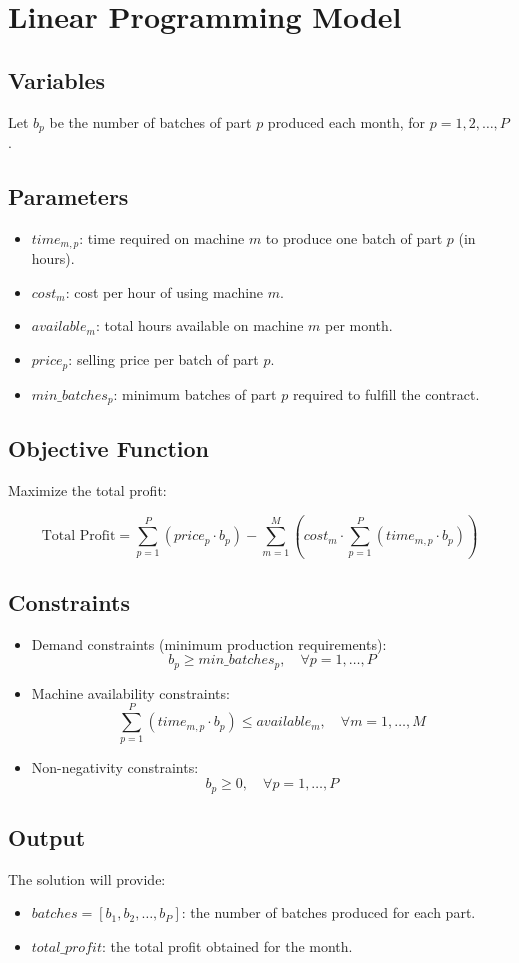 \documentclass{article}
\begin{document}
\section*{Linear Programming Model}

\subsection*{Variables}
Let \( b_p \) be the number of batches of part \( p \) produced each month, for \( p = 1, 2, \ldots, P \).

\subsection*{Parameters}
\begin{itemize}
    \item \( time_{m,p} \): time required on machine \( m \) to produce one batch of part \( p \) (in hours).
    \item \( cost_m \): cost per hour of using machine \( m \).
    \item \( available_m \): total hours available on machine \( m \) per month.
    \item \( price_p \): selling price per batch of part \( p \).
    \item \( min\_batches_p \): minimum batches of part \( p \) required to fulfill the contract.
\end{itemize}

\subsection*{Objective Function}
Maximize the total profit:

\[
\text{Total Profit} = \sum_{p=1}^{P} (price_p \cdot b_p) - \sum_{m=1}^{M} (cost_m \cdot \sum_{p=1}^{P} (time_{m,p} \cdot b_p))
\]

\subsection*{Constraints}
\begin{itemize}
    \item Demand constraints (minimum production requirements):
    \[
    b_p \geq min\_batches_p, \quad \forall p = 1, \ldots, P
    \]
    
    \item Machine availability constraints:
    \[
    \sum_{p=1}^{P} (time_{m,p} \cdot b_p) \leq available_m, \quad \forall m = 1, \ldots, M
    \]

    \item Non-negativity constraints:
    \[
    b_p \geq 0, \quad \forall p = 1, \ldots, P
    \]
\end{itemize}

\subsection*{Output}
The solution will provide:
\begin{itemize}
    \item \( batches = [b_1, b_2, \ldots, b_P] \): the number of batches produced for each part.
    \item \( total\_profit \): the total profit obtained for the month.
\end{itemize}
\end{document}
